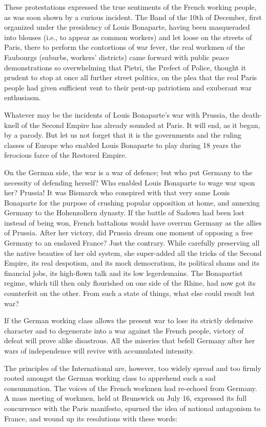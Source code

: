 \documentclass{book}
\begin{document}
These protestations expressed the true sentiments of the French working
people, as was soon shown by a curious incident. The Band of the 10th of
December, first organized under the presidency of Louis Bonaparte, having
been masqueraded into blouses (i.e., to appear as common workers) and let
loose on the streets of Paris, there to perform the contortions of war
fever, the real workmen of the Faubourgs (suburbs, workers’ districts)
came forward with public peace demonstrations so overwhelming that
Pietri, the Prefect of Police, thought it prudent to stop at once all
further street politics, on the plea that the real Paris people had given
sufficient vent to their pent-up patriotism and exuberant war
enthusiasm.

Whatever may be the incidents of Louis Bonaparte’s war with Prussia, the
death-knell of the Second Empire has already sounded at Paris. It will
end, as it began, by a parody. But let us not forget that it is the
governments and the ruling classes of Europe who enabled Louis Bonaparte
to play during 18 years the ferocious farce of the Restored Empire.

On the German side, the war is a war of defence; but who put Germany to
the necessity of defending herself? Who enabled Louis Bonaparte to wage
war upon her? Prussia! It was Bismarck who conspired with that very same
Louis Bonaparte for the purpose of crushing popular opposition at home,
and annexing Germany to the Hohenzollern dynasty. If the battle of Sadowa
had been lost instead of being won, French battalions would have overrun
Germany as the allies of Prussia. After her victory, did Prussia dream one
moment of opposing a free Germany to an enslaved France? Just the
contrary. While carefully preserving all the native beauties of her old
system, she super-added all the tricks of the Second Empire, its real
despotism, and its mock democratism, its political shams and its financial
jobs, its high-flown talk and its low legerdemains. The Bonapartist
regime, which till then only flourished on one side of the Rhine, had now
got its counterfeit on the other. From such a state of things, what else
could result but war?

If the German working class allows the present war to lose its strictly
defensive character and to degenerate into a war against the French
people, victory of defeat will prove alike disastrous. All the miseries
that befell Germany after her wars of independence will revive with
accumulated intensity.

The principles of the International are, however, too widely spread and
too firmly rooted amongst the German working class to apprehend such a sad
consummation. The voices of the French workmen had re-echoed from Germany.
A mass meeting of workmen, held at Brunswick on July 16, expressed its
full concurrence with the Paris manifesto, spurned the idea of national
antagonism to France, and wound up its resolutions with these words:
\end{document}
